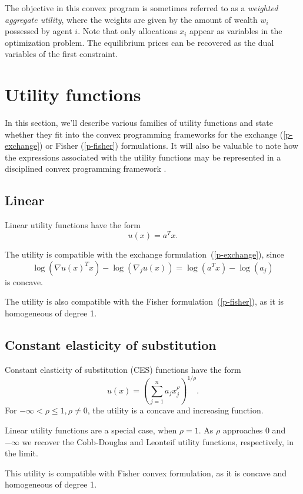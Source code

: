 \documentclass[12pt]{article}
\begin{document}
The objective in this convex program is sometimes referred to as a
\emph{weighted aggregate utility}, where the weights are given by the amount of
wealth $w_i$ possessed by agent $i$. Note that only allocations $x_i$ appear as
variables in the optimization problem. The equilibrium prices can be recovered
as the dual variables of the first constraint.

\section{Utility functions}
\label{sec:util_funcs}

In this section, we'll describe various families of utility functions
and state whether they fit into the convex programming frameworks
for the exchange (\ref{p-exchange}) or Fisher (\ref{p-fisher}) formulations.
It will also
be valuable to note how the expressions associated
with the utility functions may be represented in a disciplined
convex programming framework \cite{GBY:06,Grant2004,cvx,cvxpy}.


\subsection{Linear}

Linear utility functions have the form
\[
u(x) = a^T x.
\]

The utility is compatible with the exchange formulation~(\ref{p-exchange}),
since
\[
\log(\nabla u(x)^T x) - \log(\nabla_j u(x))  = \log(a^T x) - \log(a_j)
\]
is concave.

The utility is also compatible with the Fisher formulation~(\ref{p-fisher}),
as it is homogeneous of degree 1.


\subsection{Constant elasticity of substitution}
Constant elasticity of substitution (CES) functions have the form
\[
u(x) = \left(\sum_{j=1}^n a_j x_j^\rho \right)^{1/\rho}.
\]
For $-\infty < \rho \leq 1, \rho \neq 0$, the utility is a concave and
increasing function.

Linear utility functions are a special case, when $\rho = 1$.
As $\rho$ approaches $0$ and $-\infty$ we recover the Cobb-Douglas and Leonteif
utility functions, respectively, in the limit.

This utility is compatible with Fisher convex formulation, as it is concave and
homogeneous of degree 1.
\end{document}
